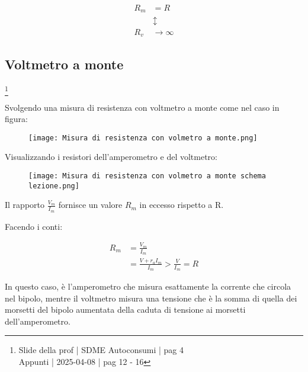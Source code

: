 {
    \Large 
    \begin{equation}
        \begin{split}
            R_m &= R
            \\ 
            &\updownarrow 
            \\ 
            R_v &\to \infty
        \end{split} 
    \end{equation}
}


\newpage 

\subsection{Voltmetro a monte}
\footnote{Slide della prof | SDME Autoconsumi | pag 4 \\  
Appunti | 2025-04-08 | pag 12 - 16}

Svolgendo una misura di resistenza con voltmetro a monte come nel caso in figura: 

\begin{figure}[h]
    \centering
    \texttt{[image: Misura di resistenza con volmetro a monte.png]}
\end{figure}

Visualizzando i resistori dell'amperometro e del voltmetro: 

\begin{figure}[h]
    \centering
    \texttt{[image: Misura di resistenza con volmetro a monte schema lezione.png]}
\end{figure}

Il rapporto $\frac{V_m}{I_m}$ fornisce un valore $R_m$ in eccesso rispetto a R. \newline 

Facendo i conti: 

{
    \Large 
    \begin{equation}
        \begin{split}
            R_m 
            &= 
            \frac{V_m}{I_m}
            \\ 
            &= 
            \frac{V + r_a I_m}{I_m} > \frac{V}{I_m} = R
        \end{split}
    \end{equation}
}

In questo caso, è l'amperometro che misura esattamente la corrente che circola nel bipolo, 
mentre il voltmetro misura una tensione che è la somma di quella dei morsetti del bipolo aumentata della caduta 
di tensione ai morsetti dell'amperometro. \newline 

